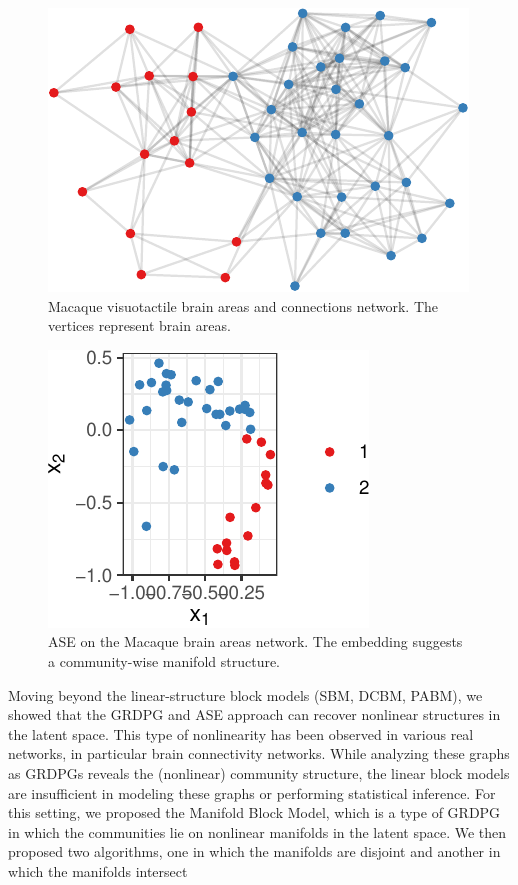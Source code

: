 \documentclass[
  12pt,
]{article}
\theoremstyle{definition}
\theoremstyle{definition}
\theoremstyle{definition}
\theoremstyle{definition}
\theoremstyle{remark}
\begin{document}
\begin{figure}[H]

{\centering \includegraphics{draft_files/figure-latex/macaque-graph-1} 

}

\caption{Macaque visuotactile brain areas and connections network. The vertices represent brain areas.}\label{fig:macaque-graph-conclusion}
\end{figure}

\begin{figure}[H]

{\centering \includegraphics{draft_files/figure-latex/macaque-ase-1} 

}

\caption{ASE on the Macaque brain areas network. The embedding suggests a community-wise manifold structure.}\label{fig:macaque-ase}
\end{figure}

Moving beyond the linear-structure block models (SBM, DCBM, PABM), we showed that the GRDPG and ASE approach can recover nonlinear structures in the latent space.
This type of nonlinearity has been observed in various real networks, in particular brain connectivity networks.
While analyzing these graphs as GRDPGs reveals the (nonlinear) community structure, the linear block models are insufficient in modeling these graphs or performing statistical inference.
For this setting, we proposed the Manifold Block Model, which is a type of GRDPG in which the communities lie on nonlinear manifolds in the latent space.
We then proposed two algorithms, one in which the manifolds are disjoint and another in which the manifolds intersect
\end{document}

